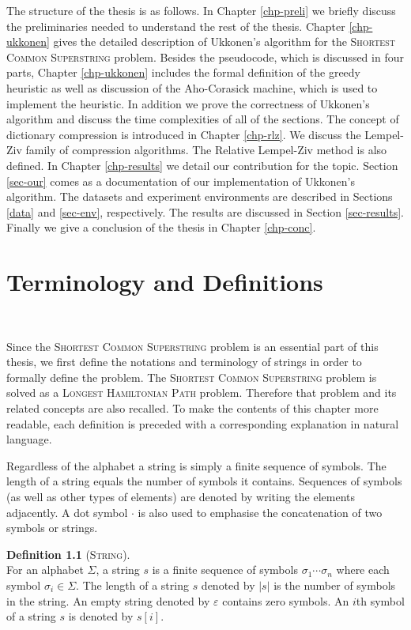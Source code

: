 \documentclass[english,twoside,censored,csm,algorithms-track-2020]{HYthesisML}
\theoremstyle{plain}
\theoremstyle{definition}
\newtheorem{definition}[theorem]{Definition}
\begin{document}
The structure of the thesis is as follows. In Chapter \ref{chp-preli} we briefly discuss the
preliminaries needed to understand the rest of the thesis. Chapter \ref{chp-ukkonen} gives the detailed
description of Ukkonen's algorithm for the \textsc{Shortest Common Superstring} problem.
Besides the pseudocode, which is discussed in four parts, Chapter \ref{chp-ukkonen} includes the
formal definition of the greedy heuristic as well as discussion of the Aho-Corasick machine,
which is used to implement the heuristic. In addition we prove the correctness of Ukkonen's algorithm
and discuss the time complexities of all of the sections. The concept of dictionary compression is
introduced in Chapter \ref{chp-rlz}. We discuss the Lempel-Ziv family of compression algorithms. The
Relative Lempel-Ziv method is also defined. In Chapter \ref{chp-results} we detail our contribution for
the topic. Section \ref{sec-our} comes as a documentation of our implementation of Ukkonen's
algorithm. The datasets and experiment environments are described in Sections \ref{data} and
\ref{sec-env}, respectively. The results are discussed in Section \ref{sec-results}.
Finally we give a conclusion of the thesis in Chapter \ref{chp-conc}.


\chapter{Terminology and Definitions}~\label{chp-preli}

Since the \textsc{Shortest Common Superstring} problem is an essential part of this thesis, we
first define the notations and terminology of strings in order to formally define the problem.
The \textsc{Shortest Common Superstring} problem is solved as a \textsc{Longest Hamiltonian Path}
problem. Therefore that problem and its related concepts are also recalled.
To make the contents of this chapter more readable,
each definition is preceded with a corresponding explanation in natural language.

Regardless of the alphabet a string is simply a finite sequence of symbols.
The length of a string equals the number of symbols it contains. Sequences of symbols
(as well as other types of elements) are denoted by writing the elements adjacently.
A dot symbol $\cdot$ is also used to emphasise the concatenation of two symbols or strings.

\begin{definition}[\textsc{String}]~\label{def-string}\\
  For an alphabet $\Sigma$, a string $s$ is a finite sequence of symbols  ${\sigma_1\cdots \sigma_n}$ where each symbol $\sigma_i \in \Sigma$.
  The length of a string $s$ denoted by $|s|$ is the number of symbols in the string.
  An empty string denoted by $\varepsilon$ contains zero symbols. An $i$th symbol of a string $s$
  is denoted by $s[i]$.
\end{definition}
\end{document}
